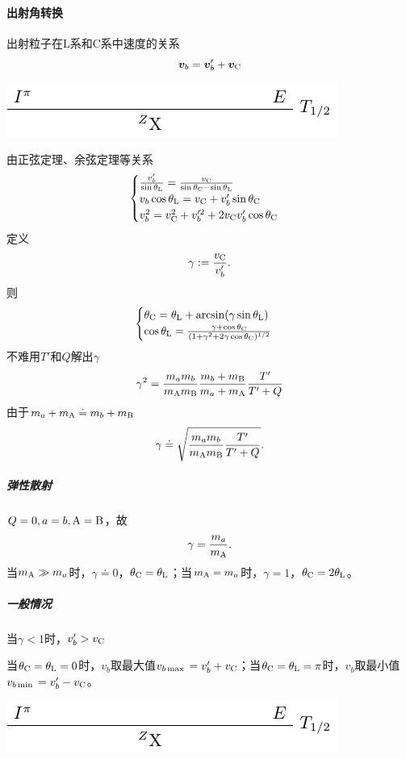 \paragraph{出射角转换}
出射粒子在L系和C系中速度的关系
\[
	\bm v_b=\bm v'_b+\bm v_{\mathrm C}
\]
\begin{center}
	\includegraphics[page=9]{figures/tikz/layouts.pdf}
\end{center}
由正弦定理、余弦定理等关系
\[
	\begin{cases}
		\frac{v_b'}{\sin\theta_{\mathrm L}}=\frac{v_{\mathrm C}}{\sin\theta_{\mathrm C}-\sin\theta_{\mathrm L}}\\
		v_b\cos\theta_{\mathrm L}=v_{\mathrm C}+v_b'\sin\theta_{\mathrm C}\\
		v_b^2=v_{\mathrm C}^2+v_b'^2+2v_{\mathrm C} v_b'\cos\theta_{\mathrm C}
	\end{cases}
\]
定义
\begin{align}
	\gamma:=\frac{v_{\mathrm C}}{v_b'}.
\end{align}
则
\begin{align}
	\begin{cases}
		\theta_{\mathrm C}=\theta_{\mathrm L}+\arcsin(\gamma\sin\theta_{\mathrm L})\\
		\cos\theta_{\mathrm L}=\frac{\gamma+\cos\theta_{\mathrm C}}{(1+\gamma^2+2\gamma\cos\theta_{\mathrm C})^{1/2}}
	\end{cases}
\end{align}
不难用$T'$和$Q$解出$\gamma$
\[
	\gamma^2=\frac{m_am_b}{m_{\mathrm{A}}m_{\mathrm{B}}}\frac{m_b+m_{\mathrm{B}}}{m_a+m_{\mathrm{A}}}\frac{T'}{T'+Q}
\]
由于$m_a+m_{\mathrm{A}}\doteq m_b+m_{\mathrm{B}}$
\begin{align}
	\gamma\doteq\sqrt{\frac{m_am_b}{m_{\mathrm{A}}m_{\mathrm{B}}}\frac{T'}{T'+Q}}.
\end{align}
\subparagraph{弹性散射}$Q=0,a=b,\mathrm{A}=\mathrm{B}$，故 
\[
	\gamma=\frac{m_a}{m_{\mathrm{A}}}.
\]
当$m_{\mathrm{A}}\gg m_a$时，$\gamma\doteq 0$，$\theta_{\mathrm C}=\theta_{\mathrm L}$；当$m_{\mathrm{A}}= m_a$时，$\gamma=1$，$\theta_{\mathrm C}=2\theta_{\mathrm L}$。
\subparagraph{一般情况}当$\gamma<1$时，$v_b'>v_{\mathrm C}$

当$\theta_{\mathrm C}=\theta_{\mathrm L}=0$时，$v_b$取最大值$v_{b\max{}}=v_b'+v_{\mathrm C}$；当$\theta_{\mathrm C}=\theta_{\mathrm L}=\pi$时，$v_b$取最小值$v_{b\min{}}=v_b'-v_{\mathrm C}$。
\begin{center}
	\includegraphics[page=10]{figures/tikz/layouts.pdf}
\end{center}

